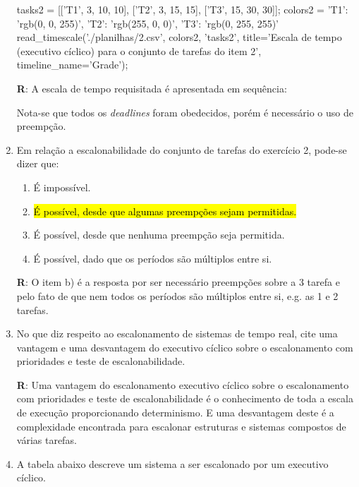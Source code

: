 \documentclass[
	10pt,				%
	openright,			%
	oneside,			%
	a4paper,			%
	english,			%
	french,				%
	spanish,			%
	brazil,				%
	]{abntex2}
\newcommand{\ª}{%
\textordfeminine
}
\begin{document}
\begin{enumerate}
\begin{sagesilent}
tasks2 = [['T1', 3, 10, 10], ['T2', 3, 15, 15], ['T3', 15, 30, 30]];
colors2 = {'T1': 'rgb(0, 0, 255)',
                  'T2': 'rgb(255, 0, 0)',
                  'T3': 'rgb(0, 255, 255)'}
read_timescale('./planilhas/2.csv', colors2, 'tasks2', title='Escala de tempo (executivo cíclico) para o conjunto de tarefas do item 2', timeline_name='Grade');
\end{sagesilent}

\begin{center}
\end{center}
\textbf{R}: A escala de tempo requisitada é apresentada em sequência:
\begin{center}
\end{center}
Nota-se que todos os \textit{deadlines} foram obedecidos, porém é necessário o uso de preempção.

\item Em relação a escalonabilidade do conjunto de tarefas do exercício 2, pode-se dizer que:
	\begin{enumerate}[label=\alph*)]
		\item É impossível.
		\item \hl{É possível, desde que algumas preempções sejam permitidas.}
		\item É possível, desde que nenhuma preempção seja permitida.
		\item É possível, dado que os períodos são múltiplos entre si.
	\end{enumerate}

\textbf{R}: O item b) é a resposta por ser necessário preempções sobre a 3\ª{} tarefa e pelo fato de que nem todos os períodos são múltiplos entre si, e.g. as 1\ª{} e 2\ª{} tarefas. 
	
\item No que diz respeito ao escalonamento de sistemas de tempo real, cite uma vantagem e uma desvantagem 
do executivo cíclico sobre o escalonamento com prioridades e teste de escalonabilidade.

\textbf{R}: Uma vantagem do escalonamento executivo cíclico sobre o escalonamento com prioridades e teste de escalonabilidade é o conhecimento de toda a escala de execução proporcionando determinismo.
E uma desvantagem deste é a complexidade encontrada para escalonar estruturas e sistemas compostos de várias tarefas.

\item A tabela abaixo descreve um sistema a ser escalonado por um executivo cíclico.


\end{enumerate}
\end{document}
